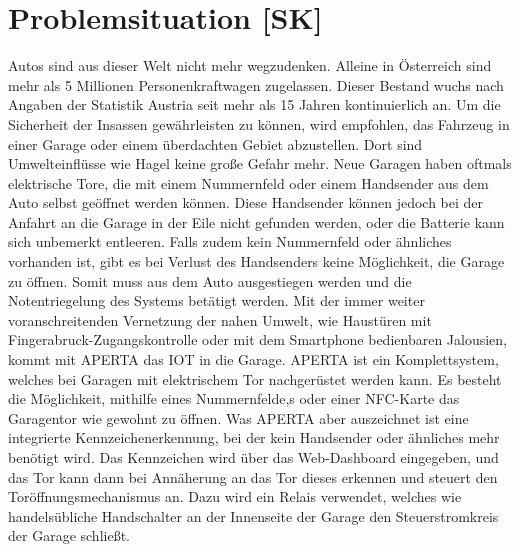 \section{Problemsituation [SK]}
Autos sind aus dieser Welt nicht mehr wegzudenken. Alleine in Österreich sind mehr als 5 Millionen Personenkraftwagen zugelassen. Dieser Bestand wuchs nach Angaben der Statistik Austria seit mehr als 15 Jahren kontinuierlich an.\cite{StatAustPKW} Um die Sicherheit der Insassen gewährleisten zu können, wird empfohlen, das Fahrzeug in einer Garage oder einem überdachten Gebiet abzustellen. Dort sind Umwelteinflüsse wie Hagel keine große Gefahr mehr. Neue Garagen haben oftmals elektrische Tore, die mit einem Nummernfeld oder einem Handsender aus dem Auto selbst geöffnet werden können. Diese Handsender können jedoch bei der Anfahrt an die Garage in der Eile nicht gefunden werden, oder die Batterie kann sich unbemerkt entleeren. Falls zudem kein Nummernfeld oder ähnliches vorhanden ist, gibt es bei Verlust des Handsenders keine Möglichkeit, die Garage zu öffnen. Somit muss aus dem Auto ausgestiegen werden und die Notentriegelung des Systems betätigt werden.
Mit der immer weiter voranschreitenden Vernetzung der nahen Umwelt, wie Haustüren mit Fingerabruck-Zugangskontrolle oder mit dem Smartphone bedienbaren Jalousien, kommt mit APERTA das IOT in die Garage.
APERTA ist ein Komplettsystem, welches bei Garagen mit elektrischem Tor nachgerüstet werden kann. Es besteht die Möglichkeit, mithilfe eines Nummernfelde,s oder einer NFC-Karte das Garagentor wie gewohnt zu öffnen. Was APERTA aber auszeichnet ist eine integrierte Kennzeichenerkennung, bei der kein Handsender oder ähnliches mehr benötigt wird. Das Kennzeichen wird über das Web-Dashboard eingegeben, und das Tor kann dann bei Annäherung an das Tor dieses erkennen und steuert den Toröffnungsmechanismus an. Dazu wird ein Relais verwendet, welches wie handelsübliche Handschalter an der Innenseite der Garage den Steuerstromkreis der Garage schließt.

